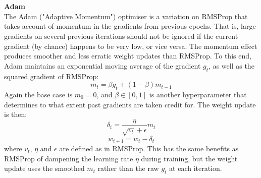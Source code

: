 \documentclass[11pt]{article} %
\theoremstyle{plain}
\theoremstyle{definition}
\begin{document}
\\
\\
\noindent
\textbf{Adam}
\\
\noindent
The Adam ("Adaptive Momentum") optimiser is a variation on RMSProp that takes account of momentum in the gradients from previous epochs. That is, large gradients on several previous iterations should not be ignored if the current gradient (by chance) happens to be very low, or vice versa. The momentum effect produces smoother and less erratic weight updates than RMSProp. To this end, Adam maintains an exponential moving average of the gradient \(g_t\), as well as the squared gradient of RMSProp:
\[ m_t = \beta g_t + (1-\beta)m_{t-1} \]
Again the base case is \(m_0=0\), and \( \beta \in [0,1]\) is another hyperparameter that determines to what extent past gradients are taken credit for. The weight update is then:
\[ \delta_t  = \dfrac{\eta}{\sqrt{v_t} + \epsilon} m_t \]
\[ w_{t+1} = w_t - \delta_t \]
where \(v_t\), \(\eta\) and \(\epsilon\) are defined as in RMSProp. This has the same benefits as RMSProp of dampening the learning rate \(\eta\) during training, but the weight update uses the smoothed \(m_t\) rather than the raw \(g_t\) at each iteration. 
\end{document}
